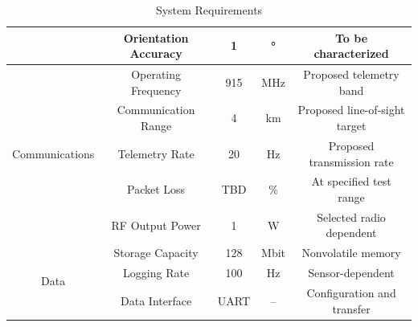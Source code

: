 \begin{table}[H]
\begin{tabular}{ccccc}
        & Orientation Accuracy
        & 1
        & \unit{\degree}
        & To be characterized \\
    \midrule


    \multirow{5}{*}{Communications}
        & Operating Frequency
        & 915
        & \unit{\mega\hertz}
        & Proposed telemetry band \\
    \cmidrule(lr){2-5}

        & Communication Range
        & 4
        & \unit{\kilo\meter}
        & Proposed line-of-sight target \\
    \cmidrule(lr){2-5}

        & Telemetry Rate
        & 20
        & \unit{\hertz}
        & Proposed transmission rate \\
    \cmidrule(lr){2-5}

        & Packet Loss
        & TBD
        & \unit{\percent}
        & At specified test range \\
    \cmidrule(lr){2-5}

        & RF Output Power
        & 1
        & \unit{\watt}
        & Selected radio dependent \\
    \midrule


    \multirow{3}{*}{Data}
        & Storage Capacity
        & 128
        & Mbit
        & Nonvolatile memory \\
    \cmidrule(lr){2-5}

        & Logging Rate
        & 100
        & \unit{\hertz}
        & Sensor-dependent \\
    \cmidrule(lr){2-5}

        & Data Interface
        & UART
        & --
        & Configuration and transfer \\

    \bottomrule
    \end{tabular}
    \vspace{3mm}
    \caption{\deimos{} System Requirements}
    \label{tab:DEIMOS_Requirements_Table}
\end{table}



